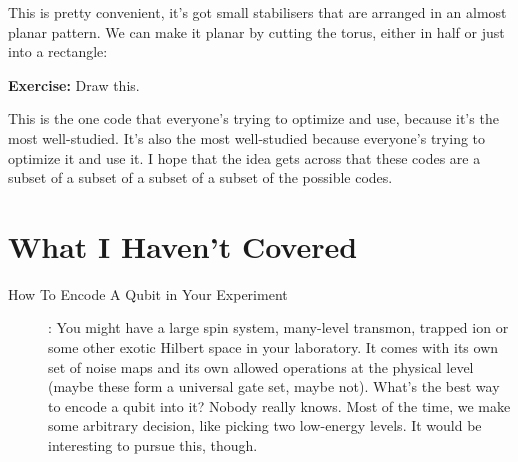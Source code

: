 \documentclass[10pt,a4paper, english]{scrartcl}
\begin{document}
This is pretty convenient, it's got small stabilisers that are arranged in an almost planar pattern. 
We can make it planar by cutting the torus, either in half or just into a rectangle:

\textbf{Exercise: } Draw this.

This is the one code that everyone's trying to optimize and use, because it's the most well-studied. 
It's also the most well-studied because everyone's trying to optimize it and use it. 
I hope that the idea gets across that these codes are a subset of a subset of a subset of a subset of the possible codes. 
\section{What I Haven't Covered}
\begin{description}
\item[How To Encode A Qubit in Your Experiment]: You might have a large spin system, many-level transmon, trapped ion or some other exotic Hilbert space in your laboratory.
It comes with its own set of noise maps and its own allowed operations at the physical level (maybe these form a universal gate set, maybe not).
What's the best way to encode a qubit into it?
Nobody really knows. 
Most of the time, we make some arbitrary decision, like picking two low-energy levels. 
It would be interesting to pursue this, though. 
\end{description}
\end{document}
